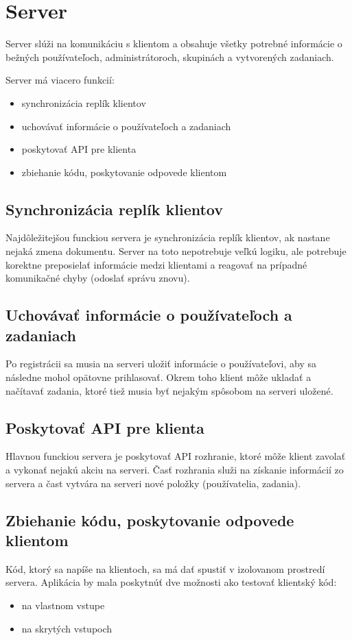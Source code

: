 \section{Server}
Server slúži na komunikáciu s klientom a obsahuje všetky potrebné informácie o bežných
používateľoch, administrátoroch, skupinách a vytvorených zadaniach.

Server má viacero funkcií:
\begin{itemize}
\item synchronizácia replík klientov
\item uchovávať informácie o používateľoch a zadaniach
\item poskytovať API pre klienta
\item zbiehanie kódu, poskytovanie odpovede klientom
\end{itemize}

\subsection{Synchronizácia replík klientov}
Najdôležitejšou funckiou servera je synchronizácia replík klientov, ak nastane nejaká zmena
dokumentu. Server na toto nepotrebuje veľkú logiku, ale potrebuje korektne preposielať informácie
medzi klientami a reagovať na prípadné komunikačné chyby (odoslať správu znovu).

\subsection{Uchovávať informácie o používateľoch a zadaniach}
Po registrácii sa musia na serveri uložiť informácie o používateľovi, aby sa následne mohol opätovne
prihlasovať. Okrem toho klient môže ukladať a načítavať zadania, ktoré tiež musia byť nejakým
spôsobom na serveri uložené.

\subsection{Poskytovať API pre klienta}
Hlavnou funckiou servera je poskytovať API rozhranie, ktoré môže klient zavolať a vykonať nejakú
akciu na serveri. Časť rozhrania služi na získanie informácií zo servera a čast vytvára
na serveri nové položky (používatelia, zadania).

\subsection{Zbiehanie kódu, poskytovanie odpovede klientom}
Kód, ktorý sa napíše na klientoch, sa má dať spustiť v izolovanom prostredí servera. Aplikácia by
mala poskytnúť dve možnosti ako testovať klientský kód:
\begin{itemize}
\item na vlastnom vstupe
\item na skrytých vstupoch
\end{itemize}

